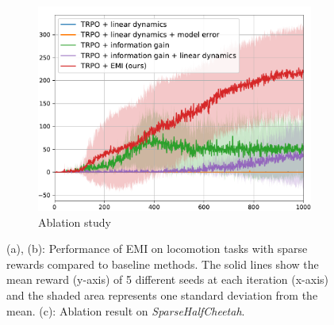 \documentclass[10pt,mathserif]{beamer}
\begin{document}
\begin{frame}
\begin{figure}[ht!]
\begin{subfigure}{0.32\textwidth}
      \end{subfigure}
      \begin{subfigure}{0.32\textwidth}
          \includegraphics[width=\textwidth]{emi_figures/SparseHalfCheetah_ablate_loss.pdf}
   	      \caption{Ablation study}
      \end{subfigure}
      \caption{(a), (b): Performance of EMI on locomotion tasks with sparse rewards compared to baseline methods. The solid lines show the mean reward (y-axis) of 5 different seeds at each iteration (x-axis) and the shaded area represents one standard deviation from the mean. (c): Ablation result on \textit{SparseHalfCheetah}.}
  \end{figure}
\end{frame}


\end{document}

